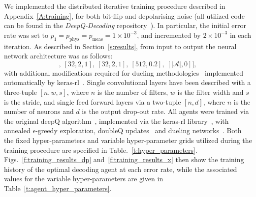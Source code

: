 \documentclass[twocolumn,preprintnumbers,amsmath,amssymb,notitlepage,nofootinbib,longbibliography,superscriptaddress,aps,pra,10pt]{revtex4-1}
\begin{document}
	We implemented the distributed iterative training procedure described in Appendix~\ref{A:training}, for both bit-flip and depolarising noise (all utilized code can be found in the \emph{DeepQ-Decoding} repository~\cite{DeepQDecoding}).
	In particular, the initial error rate was set to $p_1 = p_{\mathrm{phys}} = p_{\mathrm{meas}} = 1\times10^{-3}$, and incremented by $2\times10^{-3}$ in each iteration.
	As described in Section~\ref{s:results}, from input to output the neural network architecture was as follows:
	\begin{equation}
		[[64,3,2],~[32,2,1],~[32,2,1],~[512,0.2],~[|\mathcal{A}|, 0]],
	\end{equation}
	with additional modifications required for dueling methodologies~\cite{RLwang2015dueling} implemented automatically by keras-rl~\cite{plappert2016kerasrl}.
	Single convolutional layers have been described with a three-tuple $[n,w,s]$, where $n$ is the number of filters, $w$ is the filter width and $s$ is the stride, and single feed forward layers via a two-tuple $[n,d]$, where $n$ is the number of neurons and $d$ is the output drop-out rate.
	All agents were trained via the original deepQ algorithm~\cite{RLMnih15}, implemented via the keras-rl library~\cite{plappert2016kerasrl}, with annealed $\epsilon$-greedy exploration, doubleQ updates~\cite{RLvan2016deep} and dueling networks~\cite{RLvan2016deep}.
	Both the fixed hyper-parameters and variable hyper-parameter grids utilized during the training procedure are specified in Table.~\ref{t:hyper_parameters}.
	Figs.~\ref{f:training_results_dp} and~\ref{f:training_results_x} then show the training history of the optimal decoding agent at each error rate, while the associated values for the variable hyper-parameters are given in Table~\ref{t:agent_hyper_parameters}.
\end{document}
